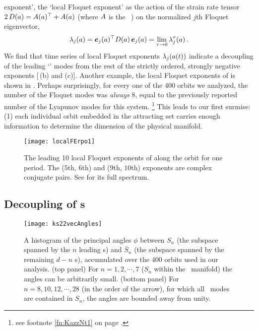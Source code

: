 exponent', the `local Floquet exponent' as the action of
the strain rate tensor
\(
2\,D(a) = {A(a)}{}^\top+A(a)
\)
(where $A$ is the \stabmat\ ) on the normalized
$j$th Floquet eigenvector,
\begin{equation}
  \lambda_{j}(a)
  = {\bm{e}_j(a)}{}^\top D(a)\,\bm{e}_j(a)
  = \lim_{\tau\rightarrow 0}\lambda_j^\tau(a)
  \,.
  \label{strainRateTens}
\end{equation}
We find that time series of local Floquet exponents $\lambda_j(a(t))$
indicate a decoupling of the leading
`\entangled' modes from the rest of the strictly ordered, strongly
negative exponents [\,(b) and (c)].
Another example, the local Floquet exponents of  is shown
in .
Perhaps surprisingly, for every one of the 400 orbits we analyzed, the
number of the {\entangled} Floquet modes was \textit{always} 8, equal to the
previously reported number of the {\entangled} Lyapunov modes for this
system.
\footnote{
  see footnote \ref{fn:KazzNt1} on page \pageref{fn:KazzNt1}.
}
This leads to our first surmise: (1) each individual orbit embedded in
the attracting set carries enough information to determine the  dimension
of the physical manifold.

\begin{figure}[!ht]
  \centering
  \texttt{[image: localFErpo1]}
  \caption[Local Floquet exponents of .]{
    The leading 10 local Floquet exponents of  along the
    orbit for one period. The ($5$th, $6$th) and ($9$th, $10$th)
    exponents are complex conjugate pairs. See 
    for its full spectrum.
  }
  \label{fig:localFErpo1}
\end{figure}

\subsection{Decoupling of \Fv s}
\label{sect:dfv}

\begin{figure}[!ht]
  \centering
  \texttt{[image: ks22vecAngles]}
  \caption[Principle angle density between subspaces formed by \Fv s]{
    A histogram of the principal angles $\phi$ between $S_n$
    (the subspace spanned by the $n$ leading \Fv s) and $\bar{S}_n$
    (the subspace spanned by the remaining $d-n$ \Fv s),
    accumulated over the 400 orbits used in our analysis. (top  panel) For
    $n=1,2,\cdots,7$ ($S_n$ within the \entangled\ manifold) the angles can be
    arbitrarily small. (bottom panel)
    For $n=8,10,12,\cdots,28$ (in the order of the arrow),
    for which all \entangled\ modes are contained in $S_n$,
    the angles are bounded away from unity.
  }
  \label{fig:ks22vecAngles}
\end{figure}

